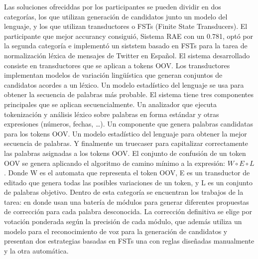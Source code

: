 \documentclass[spanish,12pt, a4paper,twoside]{paper}
\begin{document}
Las soluciones ofreciddas por los participantes se pueden dividir en dos categorías, los que utilizan generación de candidatos junto un modelo del lenguaje, y los que utilizan transductores o FSTs (Finite State Transducers). El participante que mejor accurancy consiguió, Sistema RAE \cite{porta:2013} con un 0.781, optó por la segunda categoría e implementó un siststem basado en FSTs para la tarea de normalización léxica de mensajes de Twitter en Español. El sistema desarrollado consiste en transductores que se aplican a tokens OOV. Los transductores implementan modelos de variación lingüística que generan conjuntos de candidatos acordes a un léxico. Un modelo estadístico del lenguaje se usa para obtener la secuencia de palabras más probable. El sistema tiene tres componentes principales que se aplican secuencialmente. Un analizador que ejecuta tokenización y análisis léxico sobre palabras en forma estándar y otras expresiones (números, fechas, …). Un componente que genera palabras candidatas para los tokens OOV. Un modelo estadístico del lenguaje para obtener la mejor secuencia de palabras. Y finalmente un truecaser para capitalizar correctamente las palabras asignadas a los tokens OOV. El conjunto de confusión de un token OOV se genera aplicando el algoritmo de camino mínimo a la expresión: $W \circ E \circ L$. Donde W es el automata que representa el token OOV, E es un transductor de editado que genera todas las posibles variaciones de un token, y L es un conjunto de palabras objetivo. Dentro de esta categoría se encuentran los trabajos de la tarea: \cite{ageno:2013} en donde usan una batería de módulos para generar diferentes propuestas de corrección para cada palabra desconocida. La corrección definitiva se elige por votación ponderada según la precisión de cada módulo, \cite{alegria:2013} que además utiliza un modelo para el reconocimiento de voz para la generación de candidatos y \cite{huldenfrancom:2013} presentan dos estrategias basadas en FSTs una con reglas diseñadas manualmente y la otra automática.\\\\
\end{document}
